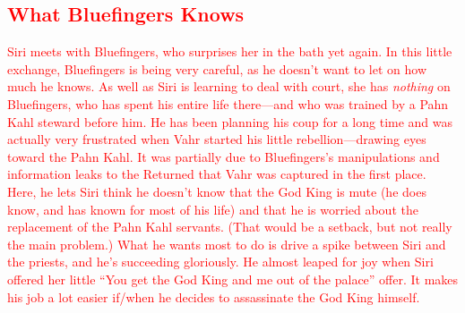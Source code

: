 \textcolor{red}{
\subsection*{What Bluefingers Knows}
}
\textcolor{red}{
Siri meets with Bluefingers, who surprises her in the bath yet again. In this little exchange, Bluefingers is being very careful, as he doesn’t want to let on how much he knows. As well as Siri is learning to deal with court, she has \textit{nothing} on Bluefingers, who has spent his entire life there—and who was trained by a Pahn Kahl steward before him. He has been planning his coup for a long time and was actually very frustrated when Vahr started his little rebellion—drawing eyes toward the Pahn Kahl. It was partially due to Bluefingers’s manipulations and information leaks to the Returned that Vahr was captured in the first place.
}
\textcolor{red}{
Here, he lets Siri think he doesn’t know that the God King is mute (he does know, and has known for most of his life) and that he is worried about the replacement of the Pahn Kahl servants. (That would be a setback, but not really the main problem.) What he wants most to do is drive a spike between Siri and the priests, and he’s succeeding gloriously. He almost leaped for joy when Siri offered her little “You get the God King and me out of the palace” offer. It makes his job a lot easier if/when he decides to assassinate the God King himself.
}


